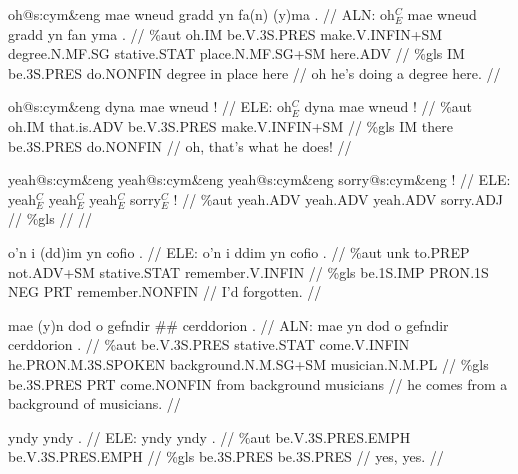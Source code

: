 \documentclass[a4paper,10pt]{article}
\begin{document}
\ex
\begingl[lingstyle=gergl]
\glchat oh@s:cym\&eng mae wneud gradd yn fa(n) (y)ma . //
\glsurface ALN:  oh$^{C}_{E}$ mae wneud gradd yn fan yma .  //
\glauto \%aut  oh{\scriptsize .IM} be{\scriptsize .V.3S.PRES} make{\scriptsize .V.INFIN+SM} degree{\scriptsize .N.MF.SG} stative{\scriptsize .STAT} place{\scriptsize .N.MF.SG+SM} here{\scriptsize .ADV}   //
\glmanual \%gls  IM be{\scriptsize .3S.PRES} do{\scriptsize .NONFIN} degree in place here   //
\gleng oh he's doing a degree here. //
\endgl
\xe

\ex
\begingl[lingstyle=gergl]
\glchat oh@s:cym\&eng dyna mae wneud ! //
\glsurface ELE:  oh$^{C}_{E}$ dyna mae wneud !  //
\glauto \%aut  oh{\scriptsize .IM} that{\scriptsize .is.ADV} be{\scriptsize .V.3S.PRES} make{\scriptsize .V.INFIN+SM}   //
\glmanual \%gls  IM there be{\scriptsize .3S.PRES} do{\scriptsize .NONFIN}   //
\gleng oh, that's what he does! //
\endgl
\xe

\ex
\begingl[lingstyle=gergl]
\glchat yeah@s:cym\&eng yeah@s:cym\&eng yeah@s:cym\&eng sorry@s:cym\&eng ! //
\glsurface ELE:  yeah$^{C}_{E}$ yeah$^{C}_{E}$ yeah$^{C}_{E}$ sorry$^{C}_{E}$ !  //
\glauto \%aut  yeah{\scriptsize .ADV} yeah{\scriptsize .ADV} yeah{\scriptsize .ADV} sorry{\scriptsize .ADJ}   //
\glmanual \%gls        //
\gleng  //
\endgl
\xe

\ex
\begingl[lingstyle=gergl]
\glchat o'n i (dd)im yn cofio . //
\glsurface ELE:  o'n i ddim yn cofio .  //
\glauto \%aut  unk to{\scriptsize .PREP} not{\scriptsize .ADV+SM} stative{\scriptsize .STAT} remember{\scriptsize .V.INFIN}   //
\glmanual \%gls  be{\scriptsize .1S.IMP} PRON{\scriptsize .1S} NEG PRT remember{\scriptsize .NONFIN}   //
\gleng I'd forgotten. //
\endgl
\xe

\ex
\begingl[lingstyle=gergl]
\glchat mae (y)n dod o gefndir \#\# cerddorion . //
\glsurface ALN:  mae yn dod o gefndir cerddorion .  //
\glauto \%aut  be{\scriptsize .V.3S.PRES} stative{\scriptsize .STAT} come{\scriptsize .V.INFIN} he{\scriptsize .PRON.M.3S.SPOKEN} background{\scriptsize .N.M.SG+SM} musician{\scriptsize .N.M.PL}   //
\glmanual \%gls  be{\scriptsize .3S.PRES} PRT come{\scriptsize .NONFIN} from background musicians   //
\gleng he comes from a background of musicians. //
\endgl
\xe

\ex
\begingl[lingstyle=gergl]
\glchat yndy yndy . //
\glsurface ELE:  yndy yndy .  //
\glauto \%aut  be{\scriptsize .V.3S.PRES.EMPH} be{\scriptsize .V.3S.PRES.EMPH}   //
\glmanual \%gls  be{\scriptsize .3S.PRES} be{\scriptsize .3S.PRES}   //
\gleng yes, yes. //
\endgl
\xe
\end{document}
